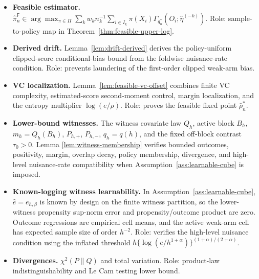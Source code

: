 \documentclass[11pt]{article}
\theoremstyle{definition}
\theoremstyle{plain}
\theoremstyle{remark}
\begin{document}
\begin{itemize}[leftmargin=*]
estimator.
\item \textbf{Feasible estimator.}
\(\widehat\pi_n^{\mathsf F}\in\arg\max_{\pi\in\Pi}\sum_k w_k n_k^{-1}
\sum_{i\in I_k}\pi(X_i)\Gamma_{q_n^*}(O_i;\widehat\eta^{(-k)})\).  Role:
sample-to-policy map in Theorem~\ref{thm:feasible-upper-log}.
\item \textbf{Derived drift.}  Lemma~\ref{lem:drift-derived} derives the
policy-uniform clipped-score conditional-bias bound from the foldwise
nuisance-rate condition.  Role: prevents laundering of the first-order
clipped weak-arm bias.
\item \textbf{VC localization.}  Lemma~\ref{lem:feasible-vc-offset} combines
finite VC complexity, estimated-score second-moment control, margin
localization, and the entropy multiplier \(\log(e/\rho)\).  Role: proves the
feasible fixed point \(\bar\rho_n^*\).
\item \textbf{Lower-bound witnesses.}  The witness covariate law \(Q_h\),
active block \(B_h\), \(m_h=Q_h(B_h)\), \(P_{h,+}\), \(P_{h,-}\),
\(q_h=q(h)\), and the fixed off-block contrast \(\tau_0>0\).  Lemma
\ref{lem:witness-membership} verifies bounded outcomes, positivity, margin,
overlap decay, policy membership, divergence, and high-level nuisance-rate
compatibility when Assumption~\ref{ass:learnable-cube} is imposed.
\item \textbf{Known-logging witness learnability.}  In
Assumption~\ref{ass:learnable-cube}, \(\widehat e=e_{h,\beta}\) is known by
design on the finite witness partition, so the lower-witness propensity
sup-norm error and propensity/outcome product are zero.  Outcome regressions
are empirical cell means, and the active weak-arm cell has expected sample
size of order \(h^{-2}\).  Role: verifies the high-level nuisance condition
using the inflated threshold \(h\{\log(e/h^{1+\alpha})\}^{(1+\alpha)/(2+\alpha)}\).
\item \textbf{Divergences.}  \(\chi^2(P\|Q)\) and total variation.  Role:
product-law indistinguishability and Le Cam testing lower bound.
\end{itemize}
\end{document}
